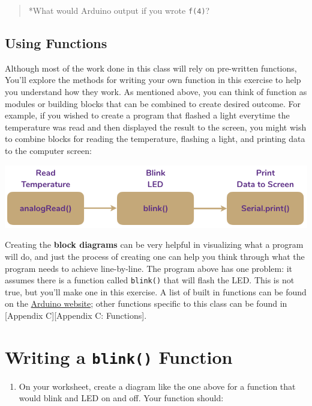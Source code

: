 \documentclass[]{book}
\providecommand{\tightlist}{%
  \setlength{\itemsep}{0pt}\setlength{\parskip}{0pt}}
\begin{document}
\begin{quote}
*What would Arduino output if you wrote \texttt{f(4)}?
\end{quote}

\hypertarget{using-functions}{%
\subsection{Using Functions}\label{using-functions}}

Although most of the work done in this class will rely on pre-written functions, You'll explore the methods for writing your own function in this exercise to help you understand how they work. As mentioned above, you can think of function as modules or building blocks that can be combined to create desired outcome. For example, if you wished to create a program that flashed a light everytime the temperature was read and then displayed the result to the screen, you might wish to combine blocks for reading the temperature, flashing a light, and printing data to the computer screen:

\includegraphics{images/blockDiagram_basic.png}

Creating the \textbf{block diagrams} can be very helpful in visualizing what a program will do, and just the process of creating one can help you think through what the program needs to achieve line-by-line. The program above has one problem: it assumes there is a function called \texttt{blink()} that will flash the LED. This is not true, but you'll make one in this exercise. A list of built in functions can be found on the \href{https://www.arduino.cc/reference/en/}{Arduino website}; other functions specific to this class can be found in {[}Appendix C{]}{[}Appendix C: Functions{]}.

\hypertarget{writing-a-blink-function}{%
\section{\texorpdfstring{Writing a \texttt{blink()} Function}{Writing a blink() Function}}\label{writing-a-blink-function}}

\begin{enumerate}
\def\labelenumi{\arabic{enumi}.}
\tightlist
\item
  On your worksheet, create a diagram like the one above for a function that would blink and LED on and off. Your function should:
\end{enumerate}
\end{document}
